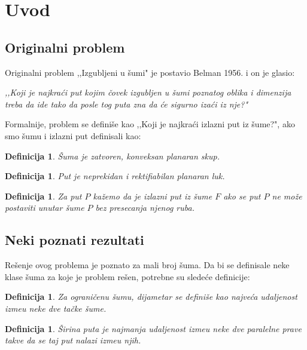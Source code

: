 \documentclass[11pt,letter]{article}
\newtheorem{df}[teo]{\bf Definicija}
\begin{document}
\section[Uvod]{Uvod}
\bigskip
\subsection[Originalni problem]{Originalni problem}
\bigskip
Originalni problem ,,Izgubljeni u \v sumi" je postavio Belman 1956.  \cite{Bellman} i on je glasio:
\begin{center}
\textit{,,Koji je najkra\' ci put kojim \v covek izgubljen u \v sumi poznatog oblika i dimenzija treba da ide tako da posle tog puta zna da \' ce sigurno iza\' ci iz nje?"}
\end{center}

\indent Formalnije, problem se defini\v se kao ,,Koji je najkra\' ci izlazni put iz \v sume?", ako smo \v sumu i izlazni put definisali kao:
\begin{df} \v Suma je zatvoren, konveksan planaran skup. \end{df}
\begin{df} Put je neprekidan i rektifiabilan planaran luk.\end{df}
\begin{df} Za put $P$ ka\v zemo da je izlazni put iz \v sume $F$ ako se put $P$ ne mo\v ze postaviti unutar \v sume $P$ bez presecanja njenog ruba.  \end{df}
\subsection[Neki poznati rezultati]{Neki poznati rezultati}
\bigskip
Re\v senje ovog problema je poznato za mali broj \v suma. Da bi se definisale neke klase \v suma za koje je problem re\v sen, potrebne su slede\' ce definicije:
\begin{df} Za ograni\v cenu \v sumu, dijametar se defini\v se kao najve\' ca udaljenost izme\dj u neke dve ta\v cke \v sume.\end{df}
\begin{df} \v Sirina puta je najmanja udaljenost izme\dj u neke dve paralelne prave takve da se taj put nalazi izme\dj u njih. \end{df}
\end{document}
